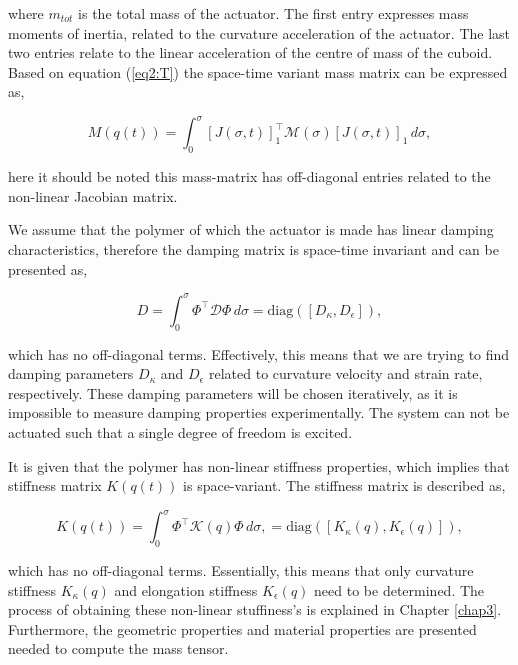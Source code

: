 where $m_{tot}$ is the total mass of the actuator. The first entry expresses mass moments of inertia, related to the curvature acceleration of the actuator. The last two entries relate to the linear acceleration of the centre of mass of the cuboid. Based on equation (\ref{eq2:T}) the space-time variant mass matrix can be expressed as, 


\begin{equation}
    M(q(t)) = \int_0^{\sigma} [J(\sigma,t)]_1^\top \mathcal{M}(\sigma)[J(\sigma,t)]_1  \hspace{2pt}d \sigma,
\end{equation}

here it should be noted this mass-matrix has off-diagonal entries related to the non-linear Jacobian matrix. 

We assume that the polymer of which the actuator is made has linear damping characteristics, therefore the damping matrix is space-time invariant and can be presented as,

\begin{equation}
    D = \int_0^\sigma \Phi^\top \mathcal{D} \Phi \hspace{2pt} d \sigma  = \text{diag}([D_\kappa, D_\epsilon]),
\end{equation}

which has no off-diagonal terms. Effectively, this means that we are trying to find damping parameters $D_\kappa$ and $D_\epsilon$ related to curvature velocity and strain rate, respectively. These damping parameters will be chosen iteratively, as it is impossible to measure damping properties experimentally. The system can not be actuated such that a single degree of freedom is excited. 

It is given that the polymer has non-linear stiffness properties, which implies that stiffness matrix $K(q(t))$ is space-variant. The stiffness matrix is described as,

\begin{equation}
    K(q(t)) = \int_0^\sigma \Phi^\top \mathcal{K}(q) \Phi \hspace{2pt} d\sigma, = \text{diag}([K_\kappa(q), K_\epsilon(q)]),
\end{equation}

which has no off-diagonal terms. Essentially, this means that only curvature stiffness $K_\kappa(q)$ and elongation stiffness $K_\epsilon(q)$ need to be determined. The process of obtaining these non-linear stuffiness's is explained in Chapter \ref{chap3}. Furthermore, the geometric properties and material properties are presented needed to compute the mass tensor. 




